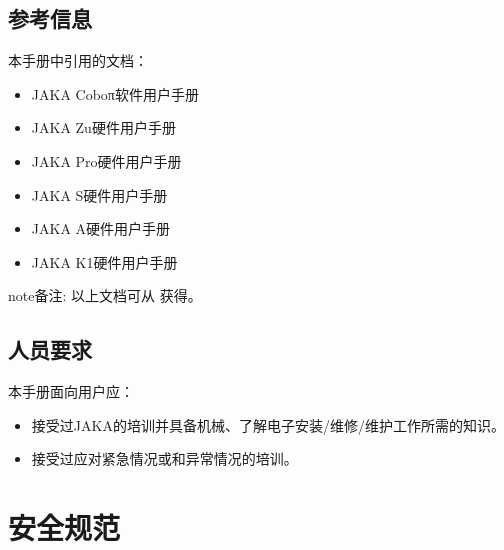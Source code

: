 \documentclass[a4paper,11pt,english,openany,oneside]{sphinxmanual}
\begin{document}
\section{参考信息}
\label{\detokenize{04 _u624b_u518c_u6982_u8ff0:id4}}
\sphinxAtStartPar
本手册中引用的文档：
\begin{itemize}
\item {} 
\sphinxAtStartPar
JAKA Coboπ软件用户手册

\item {} 
\sphinxAtStartPar
JAKA Zu硬件用户手册

\item {} 
\sphinxAtStartPar
JAKA Pro硬件用户手册

\item {} 
\sphinxAtStartPar
JAKA S硬件用户手册

\item {} 
\sphinxAtStartPar
JAKA A硬件用户手册

\item {} 
\sphinxAtStartPar
JAKA K1硬件用户手册

\end{itemize}

\begin{sphinxadmonition}{note}{备注:}
\sphinxAtStartPar
以上文档可从  获得。
\end{sphinxadmonition}


\section{人员要求}
\label{\detokenize{04 _u624b_u518c_u6982_u8ff0:id5}}
\sphinxAtStartPar
本手册面向用户应：
\begin{itemize}
\item {} 
\sphinxAtStartPar
接受过JAKA的培训并具备机械、了解电子安装/维修/维护工作所需的知识。

\item {} 
\sphinxAtStartPar
接受过应对紧急情况或和异常情况的培训。

\end{itemize}

\sphinxstepscope


\chapter{安全规范}
\label{\detokenize{05 _u5b89_u5168_u89c4_u8303:id1}}\label{\detokenize{05 _u5b89_u5168_u89c4_u8303:id2}}\label{\detokenize{05 _u5b89_u5168_u89c4_u8303::doc}}
\end{document}

